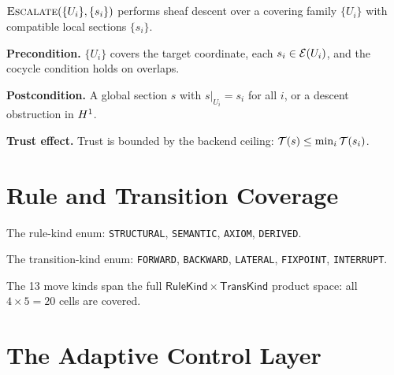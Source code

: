 \documentclass[11pt]{article}
\newcommand{\RuleKind}{\mathsf{RuleKind}}
\newcommand{\TransKind}{\mathsf{TransKind}}
\begin{document}
\subsection{\ESCALATE}\label{sec:move-escalate}

\begin{definition}[\ESCALATE]
$\textsc{Escalate}(\{U_i\}, \{s_i\})$ performs sheaf descent over a
covering family $\{U_i\}$ with compatible local sections $\{s_i\}$.
\end{definition}

\noindent\textbf{Precondition.}
$\{U_i\}$ covers the target coordinate, each $s_i \in \mathcal{E}(U_i)$,
and the cocycle condition holds on overlaps.

\noindent\textbf{Postcondition.}
A global section $s$ with $s|_{U_i} = s_i$ for all $i$,
or a descent obstruction in $H^{1}$.

\noindent\textbf{Trust effect.}
Trust is bounded by the backend ceiling: $\mathcal{T}(s) \leq
\min_i \mathcal{T}(s_i)$.


\section{Rule and Transition Coverage}\label{sec:coverage}

\begin{definition}\label{def:rule-kinds}
The rule-kind enum: \texttt{STRUCTURAL}, \texttt{SEMANTIC},
\texttt{AXIOM}, \texttt{DERIVED}.
\end{definition}

\begin{definition}\label{def:trans-kinds}
The transition-kind enum: \texttt{FORWARD}, \texttt{BACKWARD},
\texttt{LATERAL}, \texttt{FIXPOINT}, \texttt{INTERRUPT}.
\end{definition}

\begin{lemma}\label{lem:coverage}
The 13 move kinds span the full $\RuleKind \times \TransKind$
product space: all $4 \times 5 = 20$ cells are covered.
\end{lemma}


\section{The Adaptive Control Layer}\label{sec:control}
\end{document}
